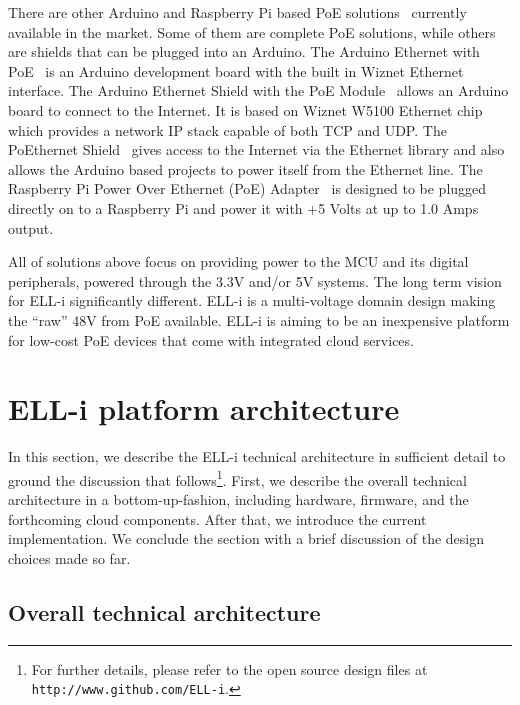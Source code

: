 \documentclass{siamltex}
\begin{document}
There are other Arduino and Raspberry Pi based PoE
solutions~\cite{xtronix, ArduinoEthernetShieldPOE, ArduinoEthernetPOE, 
  POEthernetShield} currently available in
the market.  Some of them are complete PoE solutions, while others are shields
that can be plugged into an Arduino.  The Arduino Ethernet with
PoE~\cite{ArduinoEthernetPOE} is an Arduino development board with the built in
Wiznet Ethernet interface. 
The Arduino Ethernet Shield
with the PoE Module~\cite{ArduinoEthernetShieldPOE} allows an Arduino board to
connect to the Internet. It is based on Wiznet W5100 Ethernet chip which
provides a network IP stack capable of both TCP and UDP. The PoEthernet
Shield~\cite{POEthernetShield} gives access to the Internet via the Ethernet
library and also allows the Arduino based projects to power itself from the
Ethernet line. The Raspberry Pi Power Over Ethernet (PoE) Adapter~\cite{xtronix}
is designed to be plugged directly on to a
Raspberry Pi and power it with +5 Volts at up to 1.0 Amps output. 

All of solutions above focus on providing power to the MCU and its
digital peripherals, powered through the 3.3V and/or 5V systems.
The long term vision for ELL-i significantly different.  
ELL-i is a multi-voltage domain design making the ``raw'' 48V from PoE
available.  ELL-i is aiming to be
an inexpensive platform for low-cost PoE devices that come with integrated cloud 
services. 


\section{ELL-i platform architecture}
\label{sec:architecture}

In this section, we describe the ELL-i technical architecture in
sufficient detail to ground the discussion that follows\footnote{For further
details, please refer to the open source design files at
\hbox{\tt http://www.github.com/ELL-i}.}.
First, we describe the overall technical architecture in a
bottom-up-fashion, including hardware, firmware, and the forthcoming
cloud components.  After that, we introduce the current
implementation.
We
conclude the section with a brief discussion of the design choices
made so far.

\subsection{Overall technical architecture}
\end{document}
